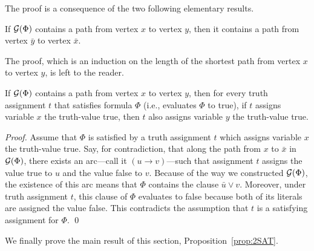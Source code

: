 The proof is a consequence of the two following elementary results.

\begin{lemma}
\label{lem:2SATlemma1}
If $\mbox{$\cal G$}(\Phi)$ contains a path from vertex $x$ to vertex $y$, then it contains a path from vertex $\bar{y}$ to vertex $\bar{x}$.
\end{lemma}

The proof, which is an induction on the length of the shortest path from vertex $x$ to vertex $y$, is left to the reader. 

\begin{lemma}
\label{lem:2SATlemma2}
If $\mbox{$\cal G$}(\Phi)$ contains a path from vertex $x$ to vertex $y$, then for every truth assignment $t$ that satisfies formula $\Phi$ (i.e., evaluates $\Phi$ to {\sc true}), if $t$ assigns variable $x$ the
truth-value {\sc true}, then $t$ also assigns variable $y$ the truth-value {\sc true}.
\end{lemma}

\begin{proof}
Assume that $\Phi$ is satisfied by a truth assignment $t$ which assigns variable $x$ the truth-value {\sc true}.  Say, for contradiction, that along the path from $x$ to $\bar{x}$ in $\mbox{$\cal G$}(\Phi)$, there exists an arc---call it $(u \rightarrow v)$---such that assignment $t$ assigns the value {\sc true} to $u$ and the value {\sc false} to $v$.  Because of the way we constructed $\mbox{$\cal G$}(\Phi)$, the existence of this arc means that $\Phi$ contains the clause $\bar{u} \vee v$.  Moreover, under truth assignment $t$, this clause of $\Phi$ evaluates to {\sc false} because both of its literals are assigned the value {\sc false}.  This contradicts the assumption that $t$ is a satisfying assignment for $\Phi$.  \qed
\end{proof}

We finally prove the main result of this section, Proposition~\ref{prop:2SAT}.

